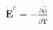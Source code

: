 \documentclass[preview]{standalone}
\begin{document}
\begin{align*}
\dot{\mathbf{E}}^e = -\frac{\partial \hat{\phi}}{\partial \tilde{\mathbf{T}}}
\end{align*}
\end{document}
